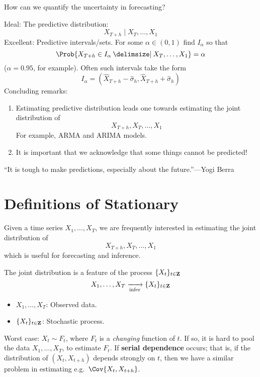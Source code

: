 How can we quantify the uncertainty in forecasting?

Ideal: The predictive distribution:
\[ X_{T+h}\mid X_T,\ldots,X_1 \]
Excellent: Predictive intervals/sets. For some $ \alpha\in(0,1) $
find $ I_\alpha $ so that
\[ \Prob{X_{T+h}\in I_\alpha\given X_T,\ldots,X_1}=\alpha \]
($ \alpha=0.95 $, for example). Often such intervals take the form
\[ I_\alpha=(\hat{X}_{T+h}-\hat{\sigma}_h,\hat{X}_{T+h}+\hat{\sigma}_h) \]
Concluding remarks:
\begin{enumerate}
    \item Estimating predictive distribution leads one towards
          estimating the joint distribution of
          \[ X_{T+h},X_T,\ldots,X_1 \]
          For example, ARMA and ARIMA models.
    \item It is important that we acknowledge that some things cannot be predicted!
\end{enumerate}
``It is tough to make predictions, especially about the future.''---Yogi Berra

\section{Definitions of Stationary}
Given a time series $ X_1,\ldots,X_T $, we are
frequently interested in estimating the joint distribution of
\[ X_{T+h},X_T,\ldots,X_1 \]
which is useful for forecasting and inference.

The joint distribution is a feature of the process
$ \{X_{t}\}_{t\in\mathbf{Z}} $
\[ X_1,\ldots,X_T\xrightarrow[\text{infer}]{}\{X_t\}_{t\in\mathbf{Z}} \]
\begin{itemize}
    \item $ X_1,\ldots,X_T $: Observed data.
    \item $ \{X_t\}_{t\in\mathbf{Z}} $: Stochastic process.
\end{itemize}

Worst case: $ X_t\sim F_t $, where $ F_t $ is a \emph{changing}
function of $ t $. If so, it is hard to pool the data
$ X_1,\ldots,X_T $, to estimate $ F_t $. If
\textbf{serial dependence} occurs; that is, if the
distribution of $ (X_t,X_{t+h}) $
depends strongly on $ t $, then we have a similar problem in estimating
e.g.\ $ \Cov{X_t,X_{t+h}} $.

